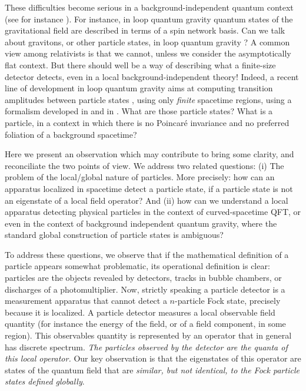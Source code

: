 \documentclass[10pt, nofootinbib]{revtex4}
\begin{document}
These difficulties become serious in a background-independent quantum 
context (see for instance \cite{book}). For instance, in loop quantum gravity
\cite{book,lqg}
quantum states of the gravitational field are described in terms of a 
spin network basis. Can we talk about gravitons, or other particle states, 
in loop quantum gravity \cite{gravitons}?  A common view among relativists is that we 
cannot, unless we consider the asymptotically flat context.  But there 
should well be a way of describing what a finite-size 
detector detects, even in a local background-independent theory! 
Indeed, a recent line of development in loop quantum gravity aims at 
computing transition amplitudes between particle states \cite{transitions},
using only {\em finite} spacetime regions, using a formalism 
developed in  \cite{boundary} and in \cite{book}. 
What are those particle states? What is a particle, in a context in which
there is no Poincar\'e invariance and no preferred foliation of a background 
spacetime?

Here we present an observation which may contribute to bring some
clarity, and reconciliate the two points of view.  We address two
related questions: (i) The problem of the local/global nature of
particles.  More precisely: how can an apparatus localized in
spacetime detect a particle state, if a particle state is not an
eigenstate of a local field operator?  And (ii) how can we understand
a local apparatus detecting physical particles in the context of
curved-spacetime QFT, or even in the context of background independent
quantum gravity, where the standard global construction of particle
states is ambiguous?

To address these questions, we observe that if the mathematical
definition of a particle appears somewhat problematic, its operational
definition is clear: particles are the objects revealed by detectors,
tracks in bubble chambers, or discharges of a photomultiplier.  Now,
strictly speaking a particle detector is a measurement apparatus that
cannot detect a $n$-particle Fock state, precisely because it is
localized.  A particle detector measures a local observable field
quantity (for instance the energy of the field, or of a field
component, in some region).  This observables quantity is represented
by an operator that in general has discrete spectrum.  \emph{The
particles observed by the detector are the quanta of this local
operator.} Our key observation is that the eigenstates of this
operator are states of the quantum field that are \emph{similar, but
not identical, to the Fock particle states defined globally}.
\end{document}
